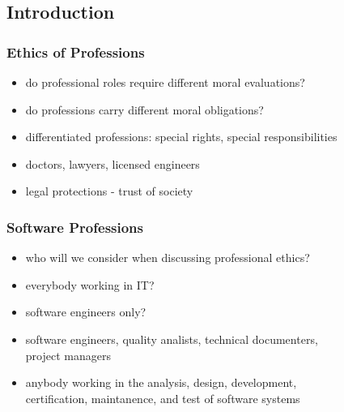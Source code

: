 \documentclass[dvipsnames]{beamer}
\theoremstyle{plain}
\begin{document}
\subsection{Introduction}

\begin{frame}
  \frametitle{Ethics of Professions}

  \begin{itemize}
    \item do professional roles require different moral evaluations?
    \item do professions carry different moral obligations?

    \pause
    \bigskip
    \item differentiated professions: special rights, special responsibilities
    \item doctors, lawyers, licensed engineers
    \item legal protections - trust of society
  \end{itemize}
\end{frame}

\begin{frame}
  \frametitle{Software Professions}

  \begin{itemize}
    \item who will we consider when discussing professional ethics?
    \item everybody working in IT?
    \item software engineers only?

    \pause
    \medskip
    \item software engineers, quality analists, technical documenters,\\
      project managers
    \item anybody working in the analysis, design, development,\\
      certification, maintanence, and test of software systems
  \end{itemize}
\end{frame}
\end{document}
